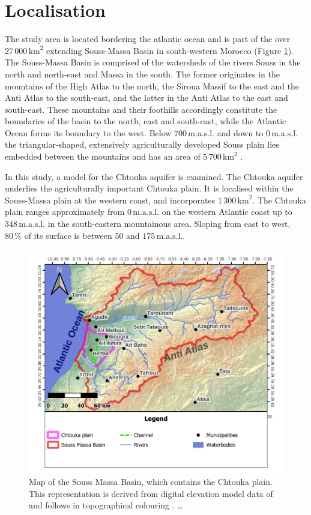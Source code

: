 \section{Localisation}

The study area is located bordering the atlantic ocean and is part of the over $27 \, 000 \, \textrm{km}^2$ extending Souss-Massa Basin in south-western Morocco (Figure \ref{Map-SoussMassaRegion}). 
The Souss-Massa Basin is comprised of the watersheds of the rivers Souss in the north and north-east and Massa in the south. 
The former originates in the mountains of the High Atlas to the north, the Siroua Massif to the east and the Anti Atlas to the south-east, and the latter in the Anti Atlas to the east and south-east. 
These mountains and their foothills accordingly constitute the boundaries of the basin to the north, east and south-east, while the Atlantic Ocean forms its boundary to the west. 
Below $700 \, \textrm{m.a.s.l.}$ and down to $0 \, \textrm{m.a.s.l.}$ the triangular-shaped, extensively agriculturally developed Souss plain lies embedded between the mountains and has an area of $5 \, 700 \, \textrm{km}^2$ \parencite{Choukr.2017}.
    
In this study, a model for the Chtouka aquifer is examined. 
The Chtouka aquifer underlies the agriculturally important Chtouka plain. 
It is localised within the Souss-Massa plain at the western coast, and incorporates $1 \, 300 \, \textrm{km}^2$. The Chtouka plain ranges approximately from $0 \, \textrm{m.a.s.l.}$ on the western Atlantic coast up to $348 \, \textrm{m.a.s.l.}$ in the south-eastern mountainous area. 
Sloping from east to west, $80 \, \%$ of its surface is between $50$ and $175 \, \textrm{m.a.s.l.}$.

\begin{figure}[h]
    \centering
    \includegraphics[width=1.0\textwidth]{./img/Map_SoussMassa.pdf}
    \caption{Map of the Souss Massa Basin, which contains the Chtouka plain. This representation is derived from digital elevation model data of \textcite{NASA.SRTM1Arc} and follows in topographical colouring \textcite{Hssaisoune.2017}. \dots}
    \label{Map-SoussMassaRegion}
\end{figure}

